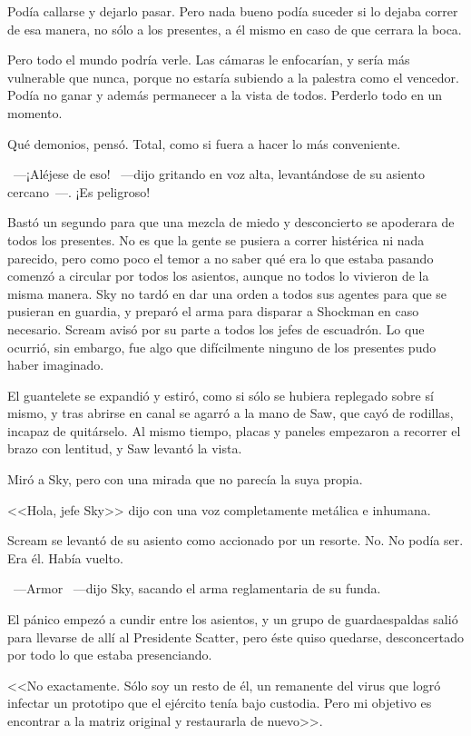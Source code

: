 Podía callarse y dejarlo pasar. Pero nada bueno podía suceder si lo dejaba correr de esa manera, no sólo a los presentes, a él mismo en caso de que cerrara la boca.

Pero todo el mundo podría verle. Las cámaras le enfocarían, y sería más vulnerable que nunca, porque no estaría subiendo a la palestra como el vencedor. Podía no ganar y además permanecer a la vista de todos. Perderlo todo en un momento.

Qué demonios, pensó. Total, como si fuera a hacer lo más conveniente.

~---¡Aléjese de eso! ~---dijo gritando en voz alta, levantándose de su asiento cercano~---. ¡Es peligroso!

Bastó un segundo para que una mezcla de miedo y desconcierto se apoderara de todos los presentes. No es que la gente se pusiera a correr histérica ni nada parecido, pero como poco el temor a no saber qué era lo que estaba pasando comenzó a circular por todos los asientos, aunque no todos lo vivieron de la misma manera. Sky no tardó en dar una orden a todos sus agentes para que se pusieran en guardia, y preparó el arma para disparar a Shockman en caso necesario. Scream avisó por su parte a todos los jefes de escuadrón.          Lo que ocurrió, sin embargo, fue algo que difícilmente ninguno de los presentes pudo haber imaginado.

El guantelete se expandió y estiró, como si sólo se hubiera replegado sobre sí mismo, y tras abrirse en canal se agarró a la mano de Saw, que cayó de rodillas, incapaz de quitárselo. Al mismo tiempo, placas y paneles empezaron a recorrer el brazo con lentitud, y Saw levantó la vista.

Miró a Sky, pero con una mirada que no parecía la suya propia.

<<Hola, jefe Sky>> dijo con una voz completamente metálica e inhumana.

Scream se levantó de su asiento como accionado por un resorte. No. No podía ser. Era él. Había vuelto.

~---Armor ~---dijo Sky, sacando el arma reglamentaria de su funda.

El pánico empezó a cundir entre los asientos, y un grupo de guardaespaldas salió para llevarse de allí al Presidente Scatter, pero éste quiso quedarse, desconcertado por todo lo que estaba presenciando.

<<No exactamente. Sólo soy un resto de él, un remanente del virus que logró infectar un prototipo que el ejército tenía bajo custodia. Pero mi objetivo es encontrar a la matriz original y restaurarla de nuevo>>. 

